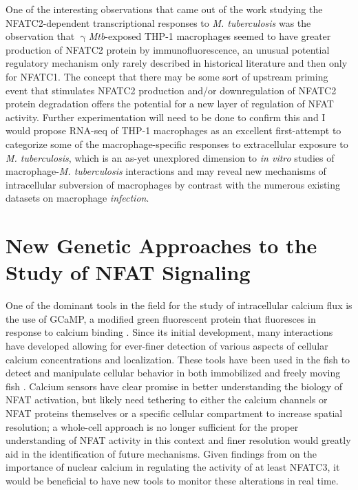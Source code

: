 One of the interesting observations that came out of the work studying the NFATC2\hyp{}dependent transcriptional responses to \textit{M. tuberculosis} was the observation that $\upgamma$\textit{Mtb}\hyp{}exposed THP\hyp{}1 macrophages seemed to have greater production of NFATC2 protein by immunofluorescence, an unusual potential regulatory mechanism only rarely described in historical literature \citep{Aramburu1995, Asagiri2005} and then only for NFATC1. The concept that there may be some sort of upstream priming event that stimulates NFATC2 production and/or downregulation of NFATC2 protein degradation offers the potential for a new layer of regulation of NFAT activity. Further experimentation will need to be done to confirm this and I would propose RNA\hyp{}seq of THP\hyp{}1 macrophages as an excellent first\hyp{}attempt to categorize some of the macrophage\hyp{}specific responses to extracellular exposure to \textit{M. tuberculosis}, which is an as\hyp{}yet unexplored dimension to \textit{in vitro} studies of macrophage\hyp{}\textit{M. tuberculosis} interactions and may reveal new mechanisms of intracellular subversion of macrophages by contrast with the numerous existing datasets on macrophage \textit{infection}.

\section{New Genetic Approaches to the Study of NFAT Signaling}\label{nfatgenetics}

One of the dominant tools in the field for the study of intracellular calcium flux is the use of GCaMP, a modified green fluorescent protein that fluoresces in response to calcium binding \citep{Nakai2001, Zhang2021b}. Since its initial development, many interactions have developed allowing for ever\hyp{}finer detection of various aspects of cellular calcium concentrations and localization. These tools have been used in the fish to detect and manipulate cellular behavior in both immobilized and freely moving fish \citep{Beerman2015, Kim2017}. Calcium sensors have clear promise in better understanding the biology of NFAT activation, but likely need tethering to either the calcium channels or NFAT proteins themselves or a specific cellular compartment to increase spatial resolution; a whole\hyp{}cell approach is no longer sufficient for the proper understanding of NFAT activity in this context and finer resolution would greatly aid in the identification of future mechanisms. Given findings from \citet{Kar2015} on the importance of nuclear calcium in regulating the activity of at least NFATC3, it would be beneficial to have new tools to monitor these alterations in real time. 

